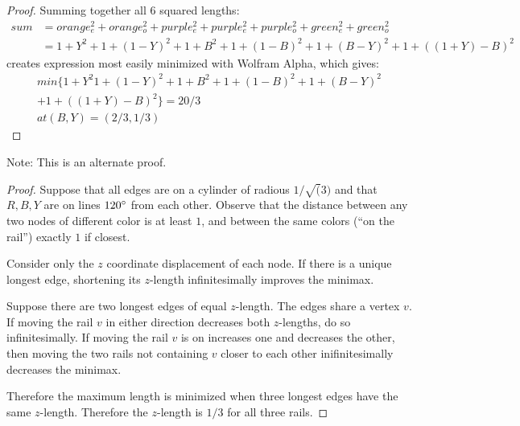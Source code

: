 \documentclass[11pt]{article}
\begin{document}
\begin{proof}
  Summing together all 6 squared lengths:
\begin{align*}
  sum &= orange_e^2 + orange_o^2 + purple_e^2 + purple_e^2 + purple_o^2 + green_e^2 + green_o^2 \\
   &= 1 + Y^2 + 1 + (1-Y)^2 +  1 + B^2 +  1+ (1-B)^2 + 1 + (B - Y)^2 + 1 + ((1+Y) - B)^2 
\end{align*}
  creates expression most easily minimized with Wolfram Alpha, which gives:
\begin{align*}
min\{1 + Y^2 1 + (1 - Y)^2 + 1 + B^2 + 1 + (1 - B)^2 + 1 + (B - Y)^2 \\
  + 1 + ((1 + Y) - B)^2\} = 20/3 \\
at (B, Y) = (2/3, 1/3)
\end{align*}
  
\end{proof}

Note: This is an alternate proof.
\begin{proof}
  Suppose that all edges are on a cylinder of radious $1/\sqrt(3)$ and that $R,B,Y$ are on lines $120\degree$ from each other. Observe
  that the distance between any two nodes of different color is at least $1$, and between the same colors (``on the rail'') exactly $1$ if closest.

  Consider only the $z$ coordinate displacement of each node. If there is a unique longest edge, shortening its $z$-length infinitesimally improves the
  minimax.

  Suppose there are two longest edges of equal $z$-length. The edges share a vertex $v$. If moving the rail $v$ in either direction decreases both
  $z$-lengths, do so infinitesimally.  If moving the rail $v$ is on increases one and decreases the other, then moving the two rails not containing
  $v$ closer to each other inifinitesimally decreases the minimax.

  Therefore the maximum length is minimized when three longest edges have the same $z$-length. Therefore the $z$-length is $1/3$ for all three rails.
\end {proof}
\end{document}
